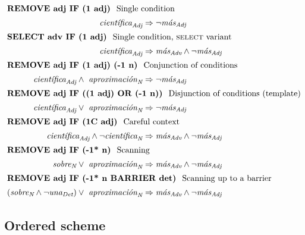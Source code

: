 \noindent \begin{align}
%
\intertext{\cgrule{REMOVE adj IF (1 adj)} Single condition } 
\cientificaAdj & \Rightarrow  \neg{}\masAdj \\
%
%
\intertext{\cgrule{SELECT adv IF (1 adj)} Single condition, \textsc{select} variant} 
\cientificaAdj & \Rightarrow \masAdv \wedge \neg{}\masAdj \\
%
%
\intertext{\cgrule{REMOVE adj IF (1 adj) (-1 n)} Conjunction of conditions}
\cientificaAdj \wedge \aproximacionN & \Rightarrow \neg{}\masAdj \\
%
%
\intertext{\cgrule{REMOVE adj IF ((1 adj)  OR (-1 n))} Disjunction of conditions (template)}
\cientificaAdj \vee \aproximacionN & \Rightarrow  \neg{}\masAdj \\
%
%
\intertext{\cgrule{REMOVE adj IF (1C adj)} Careful context}
\cientificaAdj \wedge \neg{}\cientificaN & \Rightarrow \masAdv \wedge \neg{}\masAdj \\
%
%
\intertext{\cgrule{REMOVE adj IF (-1* n)} Scanning}
%
%
\sobreN \vee \aproximacionN & \Rightarrow \masAdv \wedge \neg{}\masAdj \\
%
%
\intertext{\cgrule{REMOVE adj IF (-1* n BARRIER det)} Scanning up to a barrier}
%
%
(\sobreN \wedge \neg \unaDet) \vee \aproximacionN & \Rightarrow \masAdv \wedge \neg{}\masAdj 
%
\end{align}





\subsection{Ordered scheme}
